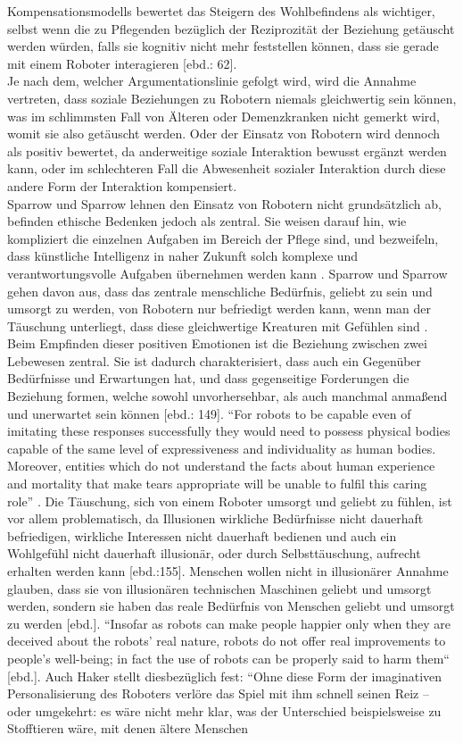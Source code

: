Kompensationsmodells bewertet das Steigern des Wohlbefindens als wichtiger, selbst wenn die zu Pflegenden bezüglich der Reziprozität der Beziehung getäuscht werden würden, falls sie kognitiv nicht mehr feststellen können, dass sie gerade mit einem Roboter interagieren [ebd.: 62].\\ Je nach dem, welcher Argumentationslinie gefolgt wird, wird die Annahme vertreten, dass soziale Beziehungen zu Robotern niemals gleichwertig sein können, was im schlimmsten Fall von Älteren oder Demenzkranken nicht gemerkt wird, womit sie also getäuscht werden. Oder der Einsatz von Robotern wird dennoch als positiv bewertet, da anderweitige soziale Interaktion bewusst ergänzt werden kann, oder im schlechteren Fall die Abwesenheit sozialer Interaktion durch diese andere Form der Interaktion kompensiert.\\Sparrow und Sparrow lehnen den Einsatz von Robotern nicht grundsätzlich ab, befinden ethische Bedenken jedoch als zentral. Sie weisen darauf hin, wie kompliziert die einzelnen Aufgaben im Bereich der Pflege sind, und bezweifeln, dass künstliche Intelligenz in naher Zukunft solch komplexe und verantwortungsvolle Aufgaben übernehmen werden kann \cite[145 ff]{sparrow}. Sparrow und Sparrow gehen davon aus, dass das zentrale menschliche Bedürfnis, geliebt zu sein und umsorgt zu werden, von Robotern nur befriedigt werden kann, wenn man der Täuschung unterliegt, dass diese gleichwertige Kreaturen mit Gefühlen sind \cite[154 ff]{sparrow}. Beim Empfinden dieser positiven Emotionen ist die Beziehung zwischen zwei Lebewesen zentral. Sie ist dadurch charakterisiert, dass auch ein Gegenüber Bedürfnisse und Erwartungen hat, und dass gegenseitige Forderungen die Beziehung formen, welche sowohl unvorhersehbar, als auch manchmal anmaßend und unerwartet sein können [ebd.: 149]. “For robots to be capable even of imitating these responses successfully they would need to possess physical bodies capable of the same level of expressiveness and individuality as human bodies. Moreover, entities which do not understand the facts about human experience and mortality that make tears appropriate will be unable to fulfil this caring role” \cite[154]{sparrow}. Die Täuschung, sich von einem Roboter umsorgt und geliebt zu fühlen, ist vor allem problematisch, da Illusionen wirkliche Bedürfnisse nicht dauerhaft befriedigen, wirkliche Interessen nicht dauerhaft bedienen und auch ein Wohlgefühl nicht dauerhaft illusionär, oder durch Selbsttäuschung, aufrecht erhalten werden kann [ebd.:155]. Menschen wollen nicht in illusionärer Annahme glauben, dass sie von illusionären technischen Maschinen geliebt und umsorgt werden, sondern sie haben das reale Bedürfnis von Menschen geliebt und umsorgt zu werden [ebd.]. “Insofar as robots can make people happier only when they are deceived about the robots’ real nature, robots do not offer real improvements to people’s well-being; in fact the use of robots can be properly said to harm them“ [ebd.].  Auch Haker stellt diesbezüglich fest: “Ohne diese Form der imaginativen Personalisierung des Roboters verlöre das Spiel mit ihm schnell seinen Reiz – oder umgekehrt: es wäre nicht mehr klar, was der Unterschied beispielsweise zu Stofftieren wäre, mit denen ältere Menschen 